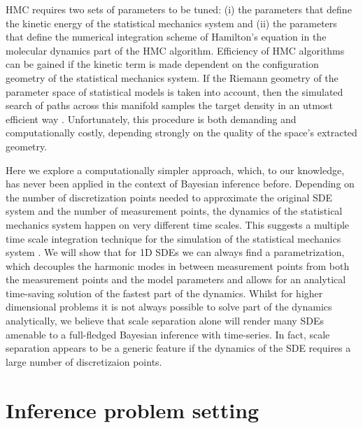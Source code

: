 \documentclass[11pt]{article}
\theoremstyle{definition}
\begin{document}
HMC requires two sets of parameters to be tuned: (i) the parameters that define the kinetic energy of the statistical mechanics system and (ii) the parameters that define the numerical integration scheme of Hamilton's equation in the molecular dynamics part of the HMC algorithm. Efficiency of HMC algorithms can be gained if the kinetic term is made dependent on the configuration geometry of the statistical mechanics system. If the Riemann geometry of the parameter space of statistical models is taken into account, then the simulated search of paths across this manifold samples the target density in an utmost efficient way
    \cite{girolami_2011_HMC}. Unfortunately, this procedure is both demanding and computationally costly,  depending strongly on the quality of the space's extracted geometry.



Here we
explore a computationally simpler approach, which, to our knowledge, has never been applied in the context of Bayesian inference before.
Depending on the number of discretization points needed to approximate the original SDE system and the number of measurement points, the dynamics of the statistical mechanics system happen on very different time scales. This suggests a multiple time scale integration technique for the simulation of the statistical mechanics system \cite{tuckerman_1993}.
We will show that for 1D SDEs we can always find a parametrization, which decouples the harmonic modes in between measurement points from both the measurement points and the model parameters and allows for an analytical time-saving solution of the fastest part of the dynamics.
Whilst for higher dimensional problems it is not always possible to solve part of the dynamics analytically, we believe that scale separation alone will render many SDEs amenable to a full-fledged Bayesian inference with time-series.
In fact, scale separation appears to be a generic feature if the dynamics of the SDE requires a large number of discretizaion points.

\section{Inference problem setting}
\end{document}
